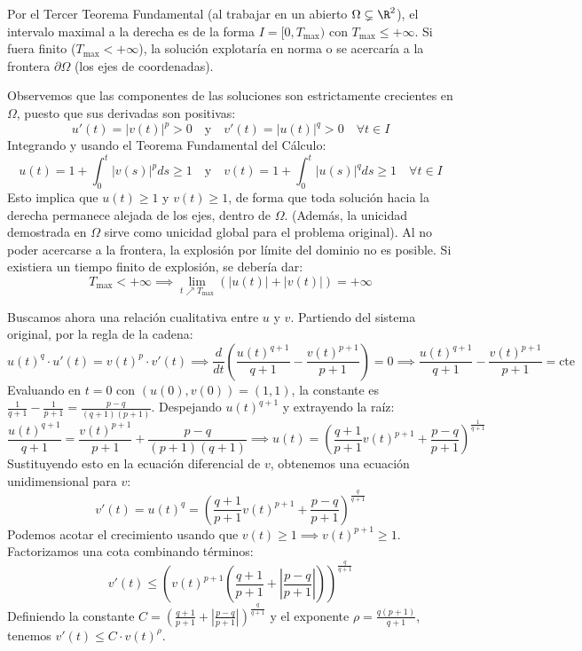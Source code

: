 {    Por el Tercer Teorema Fundamental (al trabajar en un abierto $\Omega \subsetneq \R^2$), el intervalo maximal a la derecha es de la forma $I = [0, T_{\max})$ con $T_{\max} \le +\infty$. Si fuera finito ($T_{\max} < +\infty$), la solución explotaría en norma o se acercaría a la frontera $\partial \Omega$ (los ejes de coordenadas).

    Observemos que las componentes de las soluciones son estrictamente crecientes en $\Omega$, puesto que sus derivadas son positivas:
    \[
        u'(t) = |v(t)|^p > 0 \quad \text{y} \quad v'(t) = |u(t)|^q > 0 \quad \forall t \in I
    \]
    Integrando y usando el Teorema Fundamental del Cálculo:
    \[
        u(t) = 1 + \int_0^t |v(s)|^p ds \ge 1 \quad \text{y} \quad v(t) = 1 + \int_0^t |u(s)|^q ds \ge 1 \quad \forall t \in I
    \]
    Esto implica que $u(t) \ge 1$ y $v(t) \ge 1$, de forma que toda solución hacia la derecha permanece alejada de los ejes, dentro de $\Omega$. (Además, la unicidad demostrada en $\Omega$ sirve como unicidad global para el problema original). 
    Al no poder acercarse a la frontera, la explosión por límite del dominio no es posible. Si existiera un tiempo finito de explosión, se debería dar:
    \[
        T_{\max} < +\infty \implies \lim_{t \nearrow T_{\max}} (|u(t)|+|v(t)|) = +\infty
    \]

    Buscamos ahora una relación cualitativa entre $u$ y $v$. Partiendo del sistema original, por la regla de la cadena:
    \[
        u(t)^q \cdot u'(t) = v(t)^p \cdot v'(t) \implies \frac{d}{dt} \left( \frac{u(t)^{q+1}}{q+1} - \frac{v(t)^{p+1}}{p+1} \right) = 0 \implies \frac{u(t)^{q+1}}{q+1} - \frac{v(t)^{p+1}}{p+1} = \text{cte}
    \]
    Evaluando en $t=0$ con $(u(0), v(0)) = (1,1)$, la constante es $\frac{1}{q+1} - \frac{1}{p+1} = \frac{p-q}{(q+1)(p+1)}$.
    Despejando $u(t)^{q+1}$ y extrayendo la raíz:
    \[
        \frac{u(t)^{q+1}}{q+1} = \frac{v(t)^{p+1}}{p+1} + \frac{p-q}{(p+1)(q+1)} \implies u(t) = \left( \frac{q+1}{p+1} v(t)^{p+1} + \frac{p-q}{p+1} \right)^{\frac{1}{q+1}}
    \]
    Sustituyendo esto en la ecuación diferencial de $v$, obtenemos una ecuación unidimensional para $v$:
    \[
        v'(t) = u(t)^q = \left( \frac{q+1}{p+1} v(t)^{p+1} + \frac{p-q}{p+1} \right)^{\frac{q}{q+1}}
    \]
    Podemos acotar el crecimiento usando que $v(t) \ge 1 \implies v(t)^{p+1} \ge 1$. Factorizamos una cota combinando términos:
    \[
        v'(t) \le \left( v(t)^{p+1} \left( \frac{q+1}{p+1} + \left| \frac{p-q}{p+1} \right| \right) \right)^{\frac{q}{q+1}}
    \]
    Definiendo la constante $C = \left( \frac{q+1}{p+1} + \left| \frac{p-q}{p+1} \right| \right)^{\frac{q}{q+1}}$ y el exponente $\rho = \frac{q(p+1)}{q+1}$, tenemos $v'(t) \le C \cdot v(t)^\rho$.
    
}
